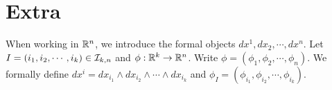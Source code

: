 \documentclass{book}
\begin{document}
	
	
	
	
	
	
	
	
	
	
	
	
	
	
	
	
	
	
	
	
	
	
	
	
	
	
	
	
	
	




	
	
	
	
	
	
	
	
	
	
	
	
	
	
	
	
	
	
	
	
	\newpage 
	\chapter{Extra}
	\begin{defn}
		When working in $\mathbb{R}^n$, we introduce the formal objects $dx^1, dx_2, \cdots, dx^n$. Let $I = (i_1, i_2, \cdots, i_k)\in \mathcal{I}_{k,n}$ and $\phi: \mathbb{R}^k \rightarrow \mathbb{R}^n$. Write $\phi = (\phi_1, \phi_2, \cdots, \phi_n)$. We formally define $dx^i = dx_{i_1}\wedge dx_{i_2} \wedge \cdots \wedge dx_{i_k}$ and $\phi_I = (\phi_{i_1}, \phi_{i_2}, \cdots, \phi_{i_k})$.   
	\end{defn}
	
\end{document}
